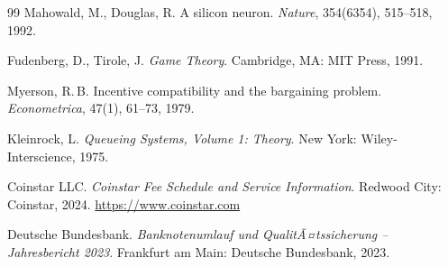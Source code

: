 ﻿\documentclass[a4paper,12pt]{article}
\theoremstyle{definition}
\begin{document}
\begin{thebibliography}{99}
  Mahowald, M., Douglas, R.
  A silicon neuron.
  \emph{Nature}, 354(6354), 515--518, 1992.

  Fudenberg, D., Tirole, J.
  \emph{Game Theory}.
  Cambridge, MA: MIT Press, 1991.

  Myerson, R.\,B.
  Incentive compatibility and the bargaining problem.
  \emph{Econometrica}, 47(1), 61--73, 1979.

  Kleinrock, L.
  \emph{Queueing Systems, Volume 1: Theory}.
  New York: Wiley-Interscience, 1975.

  Coinstar LLC.
  \emph{Coinstar Fee Schedule and Service Information}.
  Redwood City: Coinstar, 2024.
  \url{https://www.coinstar.com}

  Deutsche Bundesbank.
  \emph{Banknotenumlauf und QualitÃ¤tssicherung -- Jahresbericht 2023}.
  Frankfurt am Main: Deutsche Bundesbank, 2023.

\end{thebibliography}
\end{document}
